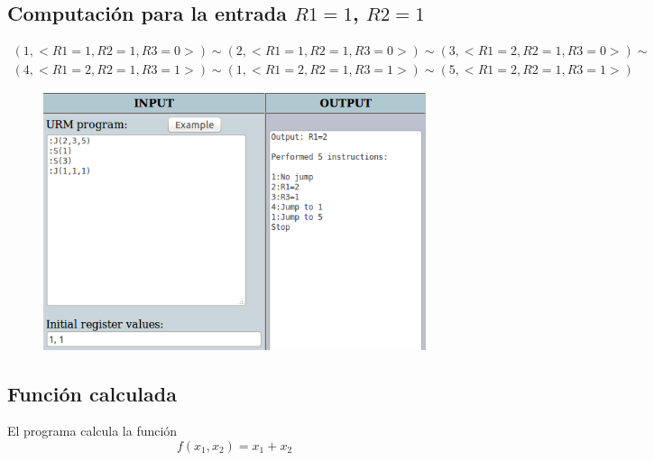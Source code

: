 		\subsection{Computación para la entrada $R1=1$, $R2=1$}
		\begin{equation*}\begin{gathered}
		(1, <R1=1, R2=1, R3=0>) \sim (2, <R1=1, R2=1, R3=0>) \sim (3, <R1=2, R2=1, R3=0>) \sim\\
		(4, <R1=2, R2=1, R3=1>) \sim (1, <R1=2, R2=1, R3=1>) \sim (5, <R1=2, R2=1, R3=1>)
		\end{gathered}\end{equation*}
		\begin{figure}[H]
  			\centering
  			\includegraphics[scale=0.5]{images/511.png}
  		\end{figure}
		\subsection{Función calculada}
		El programa calcula la función
		\begin{equation*}
  			f(x_1, x_2) = x_1+x_2
  		\end{equation*}

